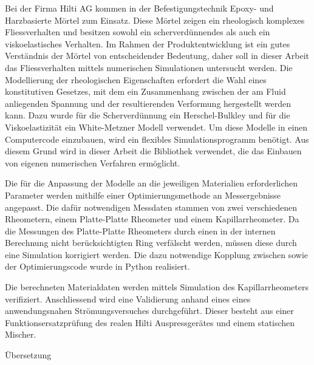 \thispagestyle{empty}
\begin{abstr}
Bei der Firma Hilti AG kommen in der Befestigungstechnik Epoxy- und Harzbasierte Mörtel zum Einsatz.
Diese Mörtel zeigen ein rheologisch komplexes Fliessverhalten und besitzen sowohl ein scherverdünnendes als auch ein viskoelastisches Verhalten. Im Rahmen der Produktentwicklung ist ein gutes Verständnis der Mörtel von entscheidender Bedeutung, daher soll in dieser Arbeit das Fliessverhalten mittels numerischen Simulationen untersucht werden.
Die Modellierung der rheologischen Eigenschaften erfordert die Wahl eines konstitutiven Gesetzes, mit dem ein Zusammenhang zwischen der am Fluid anliegenden Spannung und der resultierenden Verformung hergestellt werden kann. Dazu wurde für die Scherverdünnung ein Herschel-Bulkley und für die Viskoelastizität ein White-Metzner Modell verwendet.
Um diese Modelle in einen Computercode einzubauen, wird ein flexibles Simulationsprogramm benötigt.
Aus diesem Grund wird in dieser Arbeit die Bibliothek \openfoam{} verwendet, die das Einbauen von eigenen numerischen Verfahren ermöglicht.

Die für die Anpassung der Modelle an die jeweiligen Materialien erforderlichen Parameter werden mithilfe einer Optimierungsmethode an Messergebnisse angepasst. Die dafür notwendigen Messdaten stammen von zwei verschiedenen Rheometern, einem Platte-Platte Rheometer und einem Kapillarrheometer. Da die Messungen des Platte-Platte Rheometers durch einen in der internen Berechnung nicht berücksichtigten Ring verfälscht werden, müssen diese durch eine Simulation korrigiert werden. Die dazu notwendige Kopplung zwischen \openfoam{} sowie der Optimierungscode wurde in Python realisiert.

Die berechneten Materialdaten werden mittels Simulation des Kapillarrheometers verifiziert. Anschliessend wird eine Validierung anhand eines eines anwendungsnahen Strömungsversuches durchgeführt. Dieser besteht aus einer Funktionsersatzprüfung des realen Hilti Auspressgerätes und einem statischen Mischer.
\end{abstr}
%
%
\begin{abstr}
    \begin{todocontent}
        \1 Übersetzung
    \end{todocontent}
\end{abstr}
%
